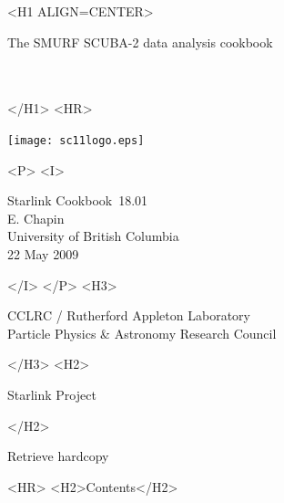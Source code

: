 \documentclass[twoside,11pt]{article}
\newcommand{\stardoccategory}  {Starlink Cookbook}
\newcommand{\stardocsource}    {sc\stardocnumber}
\newcommand{\stardocnumber}    {18.01}
\newcommand{\stardocauthors}   {E. Chapin \\ 
University of British Columbia}
\newcommand{\stardocdate}      {22 May 2009}
\newcommand{\stardoctitle}     {The SMURF SCUBA-2 data analysis cookbook}
\newcommand{\stardocversion}   {\ }
\newcommand{\stardocmanual}    {\ }
\newcommand{\htmladdnormallink}[2]{#1}
\newcommand{\htmladdimg}[1]{}
\newcommand{\htmlref}[2]{#1}
\newcommand{\htmladdtonavigation}[1]{}
\newcommand{\xlabel}[1]{}
\renewcommand{\_}{\texttt{\symbol{95}}}
\begin{document}
\begin{htmlonly}
   \xlabel{}
   \begin{rawhtml} <H1 ALIGN=CENTER> \end{rawhtml}
      \stardoctitle\\
      \stardocversion\\
      \stardocmanual
   \begin{rawhtml} </H1> <HR> \end{rawhtml}

\texttt{[image: sc11\_logo.eps]}

   \begin{rawhtml} <P> <I> \end{rawhtml}
   \stardoccategory\ \stardocnumber \\
   \stardocauthors \\
   \stardocdate
   \begin{rawhtml} </I> </P> <H3> \end{rawhtml}
      \htmladdnormallink{CCLRC}{http://www.cclrc.ac.uk} /
      \htmladdnormallink{Rutherford Appleton Laboratory}
                        {http://www.cclrc.ac.uk/ral} \\
      \htmladdnormallink{Particle Physics \& Astronomy Research 
Council}
                        {http://www.pparc.ac.uk} \\
   \begin{rawhtml} </H3> <H2> \end{rawhtml}
      \htmladdnormallink{Starlink Project}{http://star-www.rl.ac.uk/}
   \begin{rawhtml} </H2> \end{rawhtml}
   \htmladdnormallink{\htmladdimg{source.gif} Retrieve hardcopy}
      {http://star-www.rl.ac.uk/cgi-bin/hcserver?\stardocsource}\\

  \label{stardoccontents}
  \begin{rawhtml} 
    <HR>
    <H2>Contents</H2>
  \end{rawhtml}
  \htmladdtonavigation{\htmlref{\htmladdimg{contents_motif.gif}}
        {stardoccontents}}

\end{htmlonly}
\end{document}
